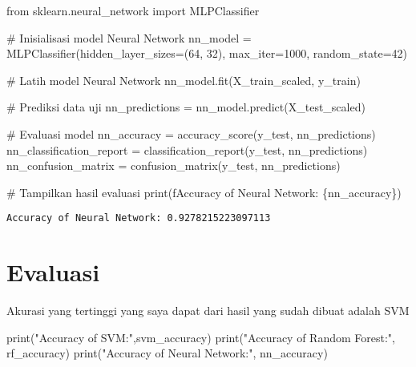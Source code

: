 \documentclass[
  letterpaper,
]{krantz}
\makeatletter
\newenvironment{Shaded}{\begin{snugshade}}{\end{snugshade}}
\newcommand{\BuiltInTok}[1]{\textcolor[rgb]{0.00,0.23,0.31}{#1}}
\newcommand{\CommentTok}[1]{\textcolor[rgb]{0.37,0.37,0.37}{#1}}
\newcommand{\DecValTok}[1]{\textcolor[rgb]{0.68,0.00,0.00}{#1}}
\newcommand{\ImportTok}[1]{\textcolor[rgb]{0.00,0.46,0.62}{#1}}
\newcommand{\NormalTok}[1]{\textcolor[rgb]{0.00,0.23,0.31}{#1}}
\newcommand{\OperatorTok}[1]{\textcolor[rgb]{0.37,0.37,0.37}{#1}}
\newcommand{\SpecialCharTok}[1]{\textcolor[rgb]{0.37,0.37,0.37}{#1}}
\newcommand{\SpecialStringTok}[1]{\textcolor[rgb]{0.13,0.47,0.30}{#1}}
\newcommand{\StringTok}[1]{\textcolor[rgb]{0.13,0.47,0.30}{#1}}
\newenvironment{kframe}{%
\medskip{}
\setlength{\fboxsep}{.8em}
 \def\at@end@of@kframe{}%
 \ifinner\ifhmode%
  \def\at@end@of@kframe{\end{minipage}}%
  \begin{minipage}{\columnwidth}%
 \fi\fi%
 \def\FrameCommand##1{\hskip\@totalleftmargin \hskip-\fboxsep
 \colorbox{shadecolor}{##1}\hskip-\fboxsep
     \hskip-\linewidth \hskip-\@totalleftmargin \hskip\columnwidth}%
 \MakeFramed {\advance\hsize-\width
   \@totalleftmargin\z@ \linewidth\hsize
   \@setminipage}}%
 {\par\unskip\endMakeFramed%
 \at@end@of@kframe}
\renewenvironment{Shaded}{\begin{kframe}}{\end{kframe}}
\makeatother
\begin{document}
\begin{Shaded}
\begin{Highlighting}[]
\ImportTok{from}\NormalTok{ sklearn.neural\_network }\ImportTok{import}\NormalTok{ MLPClassifier}

\CommentTok{\# Inisialisasi model Neural Network}
\NormalTok{nn\_model }\OperatorTok{=}\NormalTok{ MLPClassifier(hidden\_layer\_sizes}\OperatorTok{=}\NormalTok{(}\DecValTok{64}\NormalTok{, }\DecValTok{32}\NormalTok{), max\_iter}\OperatorTok{=}\DecValTok{1000}\NormalTok{, random\_state}\OperatorTok{=}\DecValTok{42}\NormalTok{)}

\CommentTok{\# Latih model Neural Network}
\NormalTok{nn\_model.fit(X\_train\_scaled, y\_train)}

\CommentTok{\# Prediksi data uji}
\NormalTok{nn\_predictions }\OperatorTok{=}\NormalTok{ nn\_model.predict(X\_test\_scaled)}

\CommentTok{\# Evaluasi model}
\NormalTok{nn\_accuracy }\OperatorTok{=}\NormalTok{ accuracy\_score(y\_test, nn\_predictions)}
\NormalTok{nn\_classification\_report }\OperatorTok{=}\NormalTok{ classification\_report(y\_test, nn\_predictions)}
\NormalTok{nn\_confusion\_matrix }\OperatorTok{=}\NormalTok{ confusion\_matrix(y\_test, nn\_predictions)}

\CommentTok{\# Tampilkan hasil evaluasi}
\BuiltInTok{print}\NormalTok{(}\SpecialStringTok{f\textquotesingle{}Accuracy of Neural Network: }\SpecialCharTok{\{}\NormalTok{nn\_accuracy}\SpecialCharTok{\}}\SpecialStringTok{\textquotesingle{}}\NormalTok{)}
\end{Highlighting}
\end{Shaded}

\begin{verbatim}
Accuracy of Neural Network: 0.9278215223097113
\end{verbatim}

\hypertarget{evaluasi}{%
\section{Evaluasi}\label{evaluasi}}

Akurasi yang tertinggi yang saya dapat dari hasil yang sudah dibuat
adalah SVM

\begin{Shaded}
\begin{Highlighting}[]
\BuiltInTok{print}\NormalTok{(}\StringTok{"Accuracy of SVM:"}\NormalTok{,svm\_accuracy)}
\BuiltInTok{print}\NormalTok{(}\StringTok{"Accuracy of Random Forest:"}\NormalTok{, rf\_accuracy)}
\BuiltInTok{print}\NormalTok{(}\StringTok{"Accuracy of Neural Network:"}\NormalTok{, nn\_accuracy)}
\end{Highlighting}
\end{Shaded}
\end{document}
